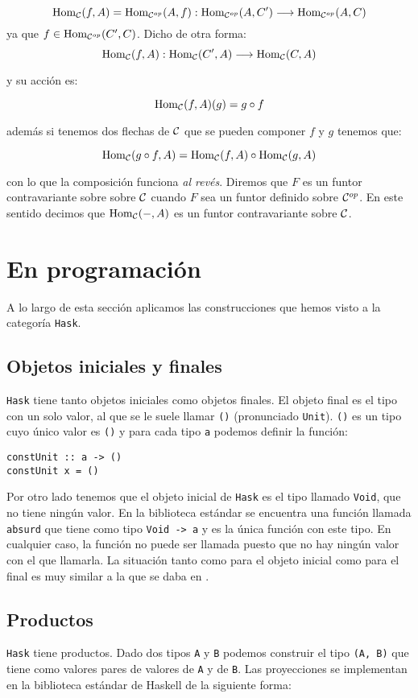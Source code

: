 $$\operatorname{Hom}_{\mathcal{C}}(f, A) = \operatorname{Hom}_{\mathcal{C}^{op}}(A, f) :
  \operatorname{Hom}_{\mathcal{C}^{op}}(A, C')\longrightarrow \operatorname{Hom}_{\mathcal{C}^{op}}(A, C)$$
ya que $f \in \operatorname{Hom}_{\mathcal{C}^{op}}(C', C)$. Dicho de otra forma:
$$\operatorname{Hom}_{\mathcal{C}}(f, A) : \operatorname{Hom}_{\mathcal{C}}(C', A)\longrightarrow \operatorname{Hom}_{\mathcal{C}}(C, A)$$

y su acción es:

$$\operatorname{Hom}_{\mathcal{C}}(f, A)(g) = g\circ f$$

además si tenemos dos flechas de $\mathcal{C}$ que se pueden componer
$f$ y $g$ tenemos que:

$$\operatorname{Hom}_{\mathcal{C}}(g \circ f, A) = \operatorname{Hom}_{\mathcal{C}}(f, A) \circ \operatorname{Hom}_{\mathcal{C}}(g, A)$$

con lo que la composición funciona \textit{al revés}. Diremos que
$F$ es un funtor contravariante sobre sobre $\mathcal{C}$ cuando $F$ sea
un funtor definido sobre $\mathcal{C}^{op}$. En este sentido
decimos que $\operatorname{Hom}_{\mathcal{C}}(-, A)$ es un funtor contravariante
sobre $\mathcal{C}$.

\section{En programación}
A lo largo de esta sección aplicamos las construcciones que hemos visto
a la categoría \texttt{Hask}.

\subsection{Objetos iniciales y finales}
\texttt{Hask} tiene tanto objetos iniciales como objetos finales. El
objeto final es el tipo con un solo valor, al que se le suele llamar
\texttt{()} (pronunciado \texttt{Unit}). \texttt{()} es un tipo
cuyo único valor es \texttt{()} y para cada tipo \texttt{a} podemos
definir la función:
\begin{verbatim}
constUnit :: a -> ()
constUnit x = ()
\end{verbatim}
Por otro lado tenemos que el objeto inicial de \texttt{Hask} es el tipo
llamado \texttt{Void}, que no tiene ningún valor. En la biblioteca
estándar se encuentra una función llamada \texttt{absurd}
que tiene
como tipo \texttt{Void -> a} y es la única función con este tipo.
En cualquier caso, la función no puede ser llamada puesto que no
hay ningún valor con el que llamarla. La situación tanto como para
el objeto inicial como para el final es muy similar a la que se daba
en \Set.

\subsection{Productos}
\texttt{Hask} tiene productos. Dado dos tipos \texttt{A} y
\texttt{B} podemos construir el tipo \texttt{(A, B)} que tiene
como valores pares de valores de \texttt{A} y de \texttt{B}.
Las proyecciones se implementan en la biblioteca estándar de
Haskell de la siguiente forma:

